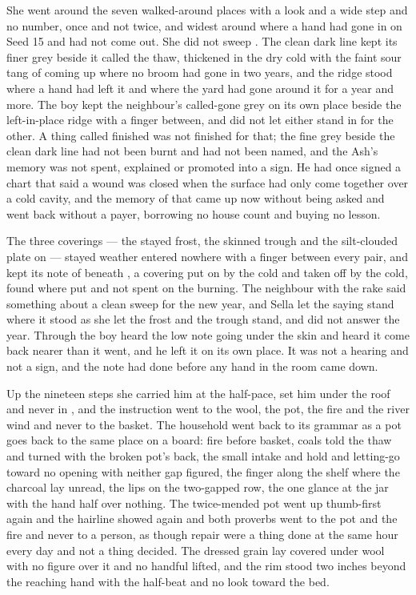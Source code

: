 She went around the seven walked-around places with a look and a wide step and no number, once and not twice, and widest around  where a hand had gone in on Seed 15 and had not come out. She did not sweep . The clean dark line kept its finer grey beside it called the thaw, thickened in the dry cold with the faint sour tang of  coming up where no broom had gone in two years, and the ridge stood where a hand had left it and where the yard had gone around it for a year and more. The boy kept the neighbour's called-gone grey on its own place beside the left-in-place ridge with a finger between, and did not let either stand in for the other. A thing called finished was not finished for that; the fine grey beside the clean dark line had not been burnt and had not been named, and the Ash's memory was not spent, explained or promoted into a sign. He had once signed a chart that said a wound was closed when the surface had only come together over a cold cavity, and the memory of that came up now without being asked and went back without a payer, borrowing no house count and buying no lesson.

The three coverings --- the stayed frost, the skinned trough and the silt-clouded plate on  --- stayed weather entered nowhere with a finger between every pair, and  kept its note of  beneath , a covering put on by the cold and taken off by the cold, found where put and not spent on the burning. The neighbour with the rake said something about a clean sweep for the new year, and Sella let the saying stand where it stood as she let the frost and the trough stand, and did not answer the year. Through  the boy heard the low note going under the skin and heard it come back nearer than it went, and he left it on its own place. It was not a hearing and not a sign, and the note had done before any hand in the room came down.

Up the nineteen steps she carried him at the half-pace, set him under the roof and never in , and the instruction went to the wool, the pot, the fire and the river wind and never to the basket. The household went back to its grammar as a pot goes back to the same place on a board: fire before basket, coals told the thaw and turned with the broken pot's back, the small intake and hold and letting-go toward no opening with neither gap figured, the finger along the shelf where the charcoal lay unread, the lips on the two-gapped row, the one glance at the jar with the hand half over nothing. The twice-mended pot went up thumb-first again and the hairline showed again and both proverbs went to the pot and the fire and never to a person, as though repair were a thing done at the same hour every day and not a thing decided. The dressed grain lay covered under wool with no figure over it and no handful lifted, and the rim stood two inches beyond the reaching hand with the half-beat and no look toward the bed.

